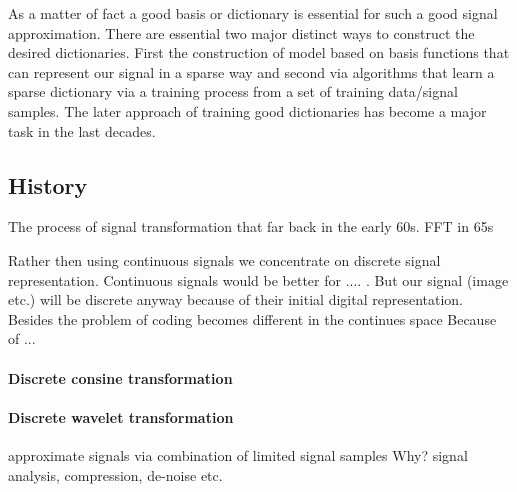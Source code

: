 As a matter of fact a good basis or dictionary is essential for such a good signal approximation. \cite{} 
There are essential two major distinct ways to construct the desired dictionaries. First the construction of model based on basis functions that can represent our signal in
a sparse way  and second via algorithms that learn a sparse dictionary via a training process from a set of training data/signal samples.
The later approach of training good dictionaries has become a major task in the last decades. \cite{Mairal2010}





\subsection{History}

The process of signal transformation that far back in the early 60s.\cite{Rubinstein2010}
FFT in 65s


Rather then using continuous signals we concentrate on discrete signal representation.
Continuous signals would be better for .... . But our signal (image etc.) will be discrete anyway because of their initial digital representation. 
Besides the problem of coding becomes different in the continues space \cite{} Because of ...

\paragraph{Discrete consine transformation}

\paragraph{Discrete wavelet transformation}

approximate signals via combination of limited signal samples
Why?
signal analysis, compression, de-noise etc.

